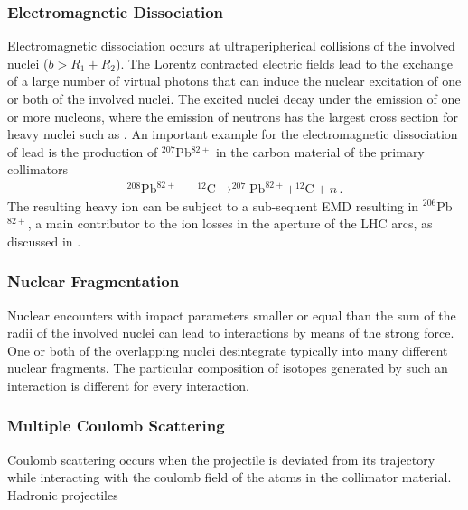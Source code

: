 \subsubsection{Electromagnetic Dissociation}
Electromagnetic dissociation occurs at ultraperipherical collisions of the involved nuclei ($b>R_1 + R_2$). The Lorentz contracted electric fields lead to the exchange of a large number of virtual photons that can induce the nuclear excitation of one or both of the involved nuclei. The excited nuclei decay under the emission of one or more nucleons, where the emission of neutrons has the largest cross section for heavy nuclei such as \lead. An important example for the electromagnetic dissociation of lead is the production of $^{207}$Pb$^{82+}$ in the carbon material of the primary collimators 
\begin{align}
^{208}\text{Pb}^{82+} &+ ^{12}\text{C} \rightarrow ^{207}\text{Pb}^{82+}  + ^{12}\text{C} + n \, .
\end{align}
The resulting heavy ion can be subject to a sub-sequent EMD resulting in $^{206}$Pb$^{82+}$, a main contributor to the ion losses in the aperture of the LHC arcs, as discussed in .

\subsubsection{Nuclear Fragmentation}
Nuclear encounters with impact parameters smaller or equal than the sum of the radii of the involved nuclei can lead to interactions by means of the strong force. One or both of the overlapping nuclei desintegrate typically into many different nuclear fragments. The particular composition of isotopes generated by such an interaction is different for every interaction. 

\subsubsection{Multiple Coulomb Scattering}

Coulomb scattering occurs when the projectile is deviated from its trajectory while interacting with the coulomb field of the atoms in the collimator material. Hadronic projectiles 

